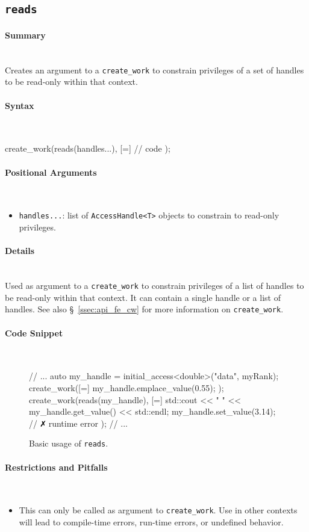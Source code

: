 \subsection{\texttt{reads}}
\label{ssec:api_fe_reads}

\paragraph{Summary} \mbox{}\\
Creates an argument to a \texttt{create\_work} to constrain
privileges of a set of handles to be read-only within that context.

\paragraph{Syntax} \mbox{}\\
\begin{CppCode}
create_work(reads(handles...), [=]{
  // code 
});
\end{CppCode}

\paragraph{Positional Arguments} \mbox{}\\
\begin{itemize}
  \item \texttt{handles...}: list of \texttt{AccessHandle<T>} objects to
  constrain to read-only privileges.
\end{itemize}


\paragraph{Details} \mbox{}\\
Used as argument to a \texttt{create\_work} to constrain
privileges of a list of handles to be read-only within that context.
It can contain a single handle or a list of handles.  See also
\S~\ref{ssec:api_fe_cw} for more information on \texttt{create\_work}.


\paragraph{Code Snippet} \mbox{}\\
\begin{figure}[!h]
\begin{CppCodeNumb}
// ...
auto my_handle = initial_access<double>("data", myRank);
create_work([=]{
  my_handle.emplace_value(0.55);
});
create_work(reads(my_handle), [=]{
  std::cout << " " << my_handle.get_value() << std::endl;
  my_handle.set_value(3.14); // $\no$ runtime error
});
// ... 
\end{CppCodeNumb}
\label{fig:fe_api_reads}
\caption{Basic usage of \texttt{reads}.}
\end{figure}


\paragraph{Restrictions and Pitfalls}\mbox{}\\
\begin{itemize}
  \item This can only be called as argument to \texttt{create\_work}.  Use in
  other contexts will lead to compile-time errors, run-time errors, or
  undefined behavior.
\end{itemize}

